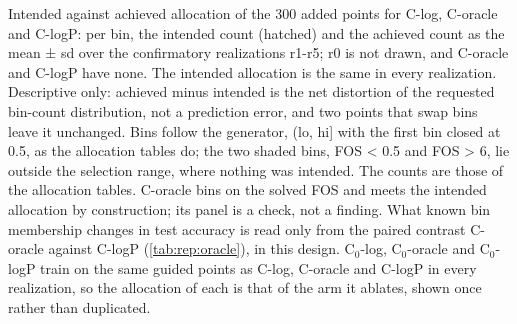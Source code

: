 Intended against achieved allocation of the 300 added points for C-log, C-oracle and C-logP: per bin, the intended count (hatched) and the achieved count as the mean ± sd over the confirmatory realizations r1-r5; r0 is not drawn, and C-oracle and C-logP have none. The intended allocation is the same in every realization. Descriptive only: achieved minus intended is the net distortion of the requested bin-count distribution, not a prediction error, and two points that swap bins leave it unchanged. Bins follow the generator, (lo, hi] with the first bin closed at 0.5, as the allocation tables do; the two shaded bins, FOS < 0.5 and FOS > 6, lie outside the selection range, where nothing was intended. The counts are those of the allocation tables. C-oracle bins on the solved FOS and meets the intended allocation by construction; its panel is a check, not a finding. What known bin membership changes in test accuracy is read only from the paired contrast C-oracle against C-logP (\cref{tab:rep:oracle}), in this design. C$_0$-log, C$_0$-oracle and C$_0$-logP train on the same guided points as C-log, C-oracle and C-logP in every realization, so the allocation of each is that of the arm it ablates, shown once rather than duplicated.
